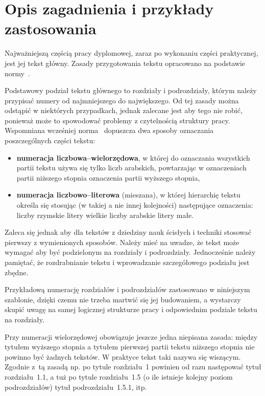 \section{Opis zagadnienia i przykłady zastosowania}

Najważniejszą częścią pracy dyplomowej, zaraz po wykonaniu części praktycznej, jest jej tekst główny. Zasady przygotowania tekstu opracowano na podstawie normy~\cite{Norma}.

Podstawowy podział tekstu głównego to rozdziały i podrozdziały, którym należy przypisać numery od najmniejszego do największego. Od tej zasady można odstąpić w niektórych przypadkach, jednak zalecane jest aby tego nie robić, ponieważ może to spowodować problemy z czytelnością struktury pracy. Wspomniana wcześniej norma~\cite{Norma} dopuszcza dwa sposoby oznaczania poszczególnych części tekstu:
\begin{itemize}
\item \textbf{numeracja liczbowa--wielorzędowa}, w której do oznaczania wszystkich partii tekstu używa się tylko liczb arabskich, powtarzając w oznaczeniach partii niższego stopnia oznaczenia partii wyższego stopnia,
\item \textbf{numeracja liczbowo--literowa} (mieszana), w której hierarchię tekstu określa się stosując (w takiej a nie innej kolejności) następujące oznaczenia: liczby rzymskie \pauza litery wielkie \pauza liczby arabskie \pauza litery małe.
\end{itemize}
Zaleca się jednak aby dla tekstów z dziedziny nauk ścisłych i techniki stosować pierwszy z wymienionych sposobów. Należy mieć na uwadze, że tekst może wymagać aby być podzielonym na rozdziały i podrozdziały. Jednocześnie należy pamiętać, że rozdrabnianie tekstu i wprowadzanie szczegółowego podziału jest zbędne. 

Przykładową numerację rozdziałów i podrozdziałów zastosowano w niniejszym szablonie, dzięki czemu nie trzeba martwić się jej budowaniem, a wystarczy skupić uwagę na samej logicznej strukturze pracy i odpowiednim podziale tekstu na rozdziały.

Przy numeracji wielorzędowej obowiązuje jeszcze jedna niepisana zasada: między tytułem wyższego stopnia a tytułem pierwszej partii tekstu niższego stopnia nie powinno być żadnych tekstów. W praktyce tekst taki nazywa się wiszącym. Zgodnie z~tą zasadą np. po tytule rozdziału~1 powinien od razu następować tytuł rozdziału~1.1, a tuż po tytule rozdziału~1.5 (o ile istnieje kolejny poziom podrozdziałów) \pauza tytuł podrozdziału~1.5.1, itp.

